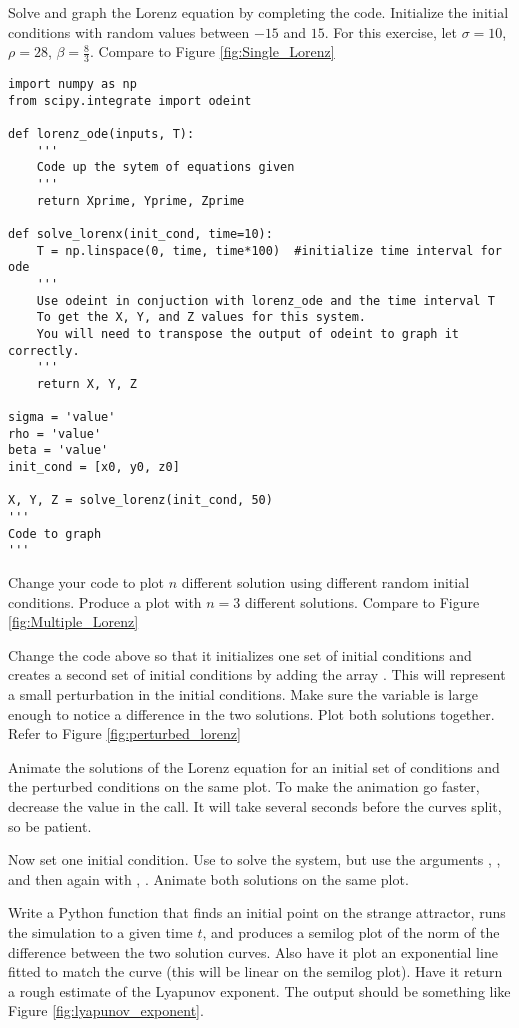 
Solve and graph the Lorenz equation by completing the code.
Initialize the initial conditions with random values between $-15$ and $15$.
For this exercise, let $\sigma=10$, $\rho=28$, $\beta=\frac{8}{3}$.
Compare to Figure \ref{fig:Single_Lorenz}
\begin{lstlisting}
import numpy as np
from scipy.integrate import odeint

def lorenz_ode(inputs, T):
	'''
	Code up the sytem of equations given
	'''
	return Xprime, Yprime, Zprime

def solve_lorenx(init_cond, time=10):
	T = np.linspace(0, time, time*100)	#initialize time interval for ode
	'''
	Use odeint in conjuction with lorenz_ode and the time interval T
	To get the X, Y, and Z values for this system.
	You will need to transpose the output of odeint to graph it correctly.
	'''
 	return X, Y, Z

sigma = 'value'
rho = 'value'
beta = 'value'
init_cond = [x0, y0, z0]

X, Y, Z = solve_lorenz(init_cond, 50)
'''
Code to graph
'''
\end{lstlisting}


Change your code to plot $n$ different solution using different random initial conditions.
Produce a plot with $n=3$ different solutions.
Compare to Figure \ref{fig:Multiple_Lorenz}

Change the code above so that it initializes one set of initial conditions and creates a second set of initial conditions by adding the array .
This will represent a small perturbation in the initial conditions. Make sure the  variable is large enough to notice a difference in the two solutions.
Plot both solutions together.
Refer to Figure \ref{fig:perturbed_lorenz}

Animate the solutions of the Lorenz equation for an initial set of conditions and the perturbed conditions on the same plot.
To make the animation go faster, decrease the  value in the  call.
It will take several seconds before the curves split, so be patient.

Now set one initial condition.
Use  to solve the system, but use the arguments , , and then again with , .
Animate both solutions on the same plot.

Write a Python function that finds an initial point on the strange attractor, runs the simulation to a given time $t$, and produces a semilog plot of the norm of the difference between the two solution curves.
Also have it plot an exponential line fitted to match the curve (this will be linear on the semilog plot).
Have it return a rough estimate of the Lyapunov exponent.
The output should be something like Figure \ref{fig:lyapunov_exponent}.

